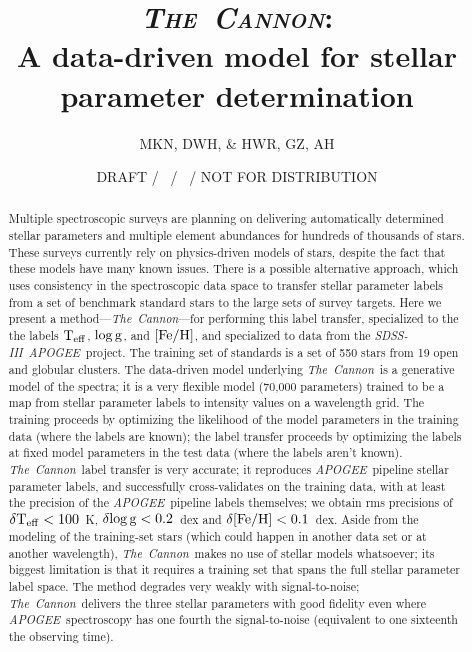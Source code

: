 \documentclass[12pt, preprint]{aastex}
\newcommand{\teff}{\mbox{$\rm T_{eff}$}}
\newcommand{\feh}{\mbox{$\rm [Fe/H]$}}
\newcommand{\logg}{\mbox{$\rm \log g$}}
\newcommand{\tc}{\textsl{The~Cannon}}
\newcommand{\apogee}{\textsl{APOGEE}}
\newcommand{\sdss}{\textsl{SDSS-III}}
\begin{document}
\title{\textsc{\tc:}\\ A data-driven model for stellar parameter determination}
\author{
  MKN,
  DWH,
  \&
  HWR,
  GZ, AH} 
\date{DRAFT / \gitdate\ / \githash\ / NOT FOR DISTRIBUTION}

\begin{abstract}%
Multiple spectroscopic surveys are planning on delivering
automatically determined stellar parameters and multiple element
abundances for hundreds of thousands of stars.
These surveys currently rely on physics-driven models of stars,
despite the fact that these models have many known issues.
There is a possible alternative approach, which uses consistency in
the spectroscopic data space to transfer stellar parameter labels from
a set of benchmark standard stars to the large sets of survey targets.
Here we present a method---\tc---for performing this label transfer,
specialized to the the labels \teff, \logg, and \feh, and specialized
to data from the \sdss\ \apogee\ project.
The training set of standards is a set of 550 stars from 19
open and globular clusters.
The data-driven model underlying \tc\ is a generative model of the
spectra; it is a very flexible model (70,000 parameters) trained to be
a map from stellar parameter labels to intensity values on a wavelength
grid.
The training proceeds by optimizing the likelihood of the model
parameters in the training data (where the labels are known); the label
transfer proceeds by optimizing the labels at fixed
model parameters in the test data (where the labels aren't known).
\tc\ label transfer is very accurate; it reproduces \apogee\ pipeline
stellar parameter labels, and successfully cross-validates on the
training data, with at least the precision of the \apogee\ pipeline
labels themselves; we obtain rms precisions of $\delta\teff< 100$~K,
$\delta\logg< 0.2$~dex and $\delta\feh< 0.1$~dex.
Aside from the modeling of the training-set stars (which could happen
in another data set or at another wavelength), \tc\ makes no use of
stellar models whatsoever; its biggest limitation is that it requires a
training set that spans the full stellar parameter label space.
The method degrades very weakly with signal-to-noise; \tc\ delivers
the three stellar parameters with good fidelity even where
\apogee\ spectroscopy has one fourth the
signal-to-noise (equivalent to one sixteenth the observing time).
\end{abstract}

\end{document}

